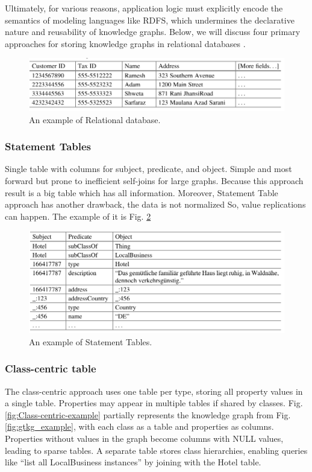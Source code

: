 \documentclass[12pt]{article}
\begin{document}
Ultimately, for various reasons, application logic must explicitly encode the semantics of modeling languages like RDFS, which undermines the declarative nature and reusability of knowledge graphs. Below, we will discuss four primary approaches for storing knowledge graphs in relational databases \cite{benMahria2021}.

\begin{figure}
    \includegraphics[width=\linewidth]{imgs/rd-example.jpeg}
    \caption{An example of Relational database.}
    \label{fig:rd_example}
\end{figure}

\subsubsection{Statement Tables}
Single table with columns for subject, predicate, and object. Simple and most forward but
prone to inefficient self-joins for large graphs. Because this approach result is a big table
which has all information. Moreover, Statement Table approach has another drawback,
the data is not normalized So, value replications can happen. The example of it is Fig. \ref{fig:Statement-Tables-example}

\begin{figure}
    \includegraphics[width=\linewidth]{imgs/Statement table.jpeg}
    \caption{An example of Statement Tables.}
    \label{fig:Statement-Tables-example}
\end{figure}

\subsubsection{Class-centric table}
The class-centric approach uses one table per type, storing all property values in a single table. Properties may appear in multiple tables if shared by classes. Fig. \ref{fig:Class-centric-example} partially represents the knowledge graph from Fig. \ref{fig:gtkg_example}, with each class as a table and properties as columns. Properties without values in the graph become columns with NULL values, leading to sparse tables. A separate table stores class hierarchies, enabling queries like “list all LocalBusiness instances” by joining with the Hotel table.
\end{document}
